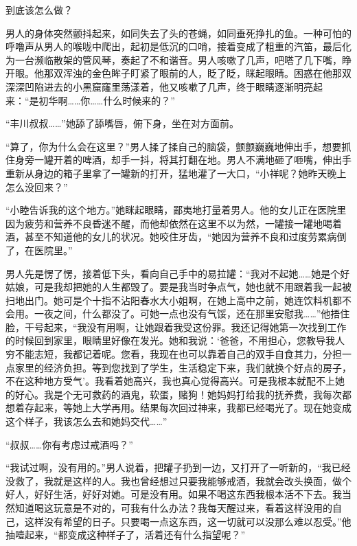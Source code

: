 \documentclass{article}
\begin{document}
到底该怎么做？



男人的身体突然颤抖起来，如同失去了头的苍蝇，如同垂死挣扎的鱼。一种可怕的呼噜声从男人的喉咙中爬出，起初是低沉的口哨，接着变成了粗重的汽笛，最后化为一台濒临散架的管风琴，奏起了不和谐音。男人咳嗽了几声，吧嗒了几下嘴，睁开眼。他那双浑浊的金色眸子盯紧了眼前的人，眨了眨，眯起眼睛。困惑在他那双深深凹陷进去的小黑窟窿里荡漾着，他又咳嗽了几声，终于眼睛逐渐明亮起来：“是初华啊……你……什么时候来的？”



“丰川叔叔……”她舔了舔嘴唇，俯下身，坐在对方面前。



“算了，你为什么会在这里？”男人揉了揉自己的脑袋，颤颤巍巍地伸出手，想要抓住身旁一罐开着的啤酒，却手一抖，将其打翻在地。男人不满地砸了咂嘴，伸出手重新从身边的箱子里拿了一罐新的打开，猛地灌了一大口，“小祥呢？她昨天晚上怎么没回来？”



“小睦告诉我的这个地方。”她眯起眼睛，鄙夷地打量着男人。他的女儿正在医院里因为疲劳和营养不良昏迷不醒，而他却依然在这里不以为然，一罐接一罐地喝着酒，甚至不知道他的女儿的状况。她咬住牙齿，“她因为营养不良和过度劳累病倒了，在医院里。”



男人先是愣了愣，接着低下头，看向自己手中的易拉罐：“我对不起她……她是个好姑娘，可是我却把她的人生都毁了。要是我当时争点气，她也就不用跟着我一起被扫地出门。她可是个十指不沾阳春水大小姐啊，在她上高中之前，她连饮料机都不会用。一夜之间，什么都没了。可她一点也没有气馁，还在那里安慰我……”他捂住脸，干号起来，“我没有用啊，让她跟着我受这份罪。我还记得她第一次找到工作的时候回到家里，眼睛里好像在发光。她和我说：‘爸爸，不用担心，您教导我人穷不能志短，我都记着呢。您看，我现在也可以靠着自己的双手自食其力，分担一点家里的经济负担。等到您找到了学生，生活稳定下来，我们就换个好点的房子，不在这种地方受气’。我看着她高兴，我也真心觉得高兴。可是我根本就配不上她的好心。我是个无可救药的酒鬼，软蛋，赌狗！她妈妈打给我的抚养费，我每次都想着存起来，等她上大学再用。结果每次回过神来，我都已经喝光了。现在她变成这个样子，我该怎么去和她妈交代……”



“叔叔……你有考虑过戒酒吗？”



“我试过啊，没有用的。”男人说着，把罐子扔到一边，又打开了一听新的，“我已经没救了，我就是这样的人。我也曾经想过只要我能够戒酒，我就会改头换面，做个好人，好好生活，好好对她。可是没有用。如果不喝这东西我根本活不下去。我当然知道喝这玩意是不对的，可我有什么办法？我每天醒过来，看着这样没用的自己，这样没有希望的日子。只要喝一点这东西，这一切就可以没那么难以忍受。”他抽噎起来，“都变成这种样子了，活着还有什么指望呢？”
\end{document}
